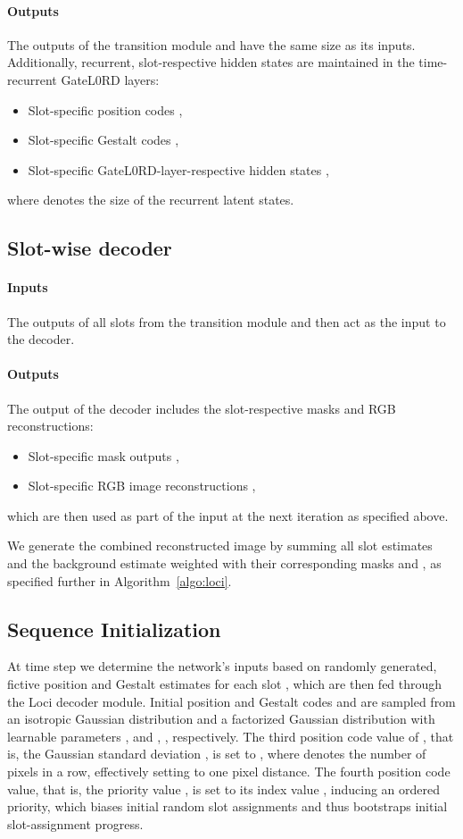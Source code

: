 \documentclass{article} \usepackage{iclr2023_conference_arxiv,times}
\begin{document}
\paragraph{Outputs} The outputs of the transition module  and  have the same size as its inputs. Additionally, recurrent, slot-respective hidden states  are maintained in the time-recurrent GateL0RD layers:
\begin{itemize}    
    \item Slot-specific position codes ,
    \item Slot-specific Gestalt codes ,
    \item Slot-specific GateL0RD-layer-respective hidden states ,
\end{itemize}
where  denotes the size of the recurrent latent states.

\subsection{Slot-wise decoder}
\paragraph{Inputs} The outputs of all slots from the transition module  and  then act as the input to the decoder.
\paragraph{Outputs} The output of the decoder includes the slot-respective masks and RGB reconstructions: 
\begin{itemize}
    \item Slot-specific mask outputs ,
    \item Slot-specific RGB image reconstructions ,
\end{itemize}
which are then used as part of the input at the next iteration as specified above.

We generate the combined reconstructed image  by summing all slot estimates  and the background estimate  weighted with their corresponding masks  and , as specified further in Algorithm~\ref{algo:loci}.

\subsection{Sequence Initialization}
\label{sec:algini}
At time step  we determine the network's inputs based on randomly generated, fictive position and Gestalt estimates for each slot , which are then fed through the Loci decoder module.
Initial position and Gestalt codes  and  are sampled from 
an isotropic Gaussian distribution  and
a factorized Gaussian distribution 
with learnable parameters 
,  and 
, , respectively.
The third position code value of , that is, the Gaussian standard deviation , is set to , where   denotes the number of pixels in a row, effectively setting  to one pixel distance.
The fourth position code value, that is, the priority value , is set to its index value , 
inducing an ordered priority, which biases initial random slot assignments and thus bootstraps initial slot-assignment progress.
\end{document}
